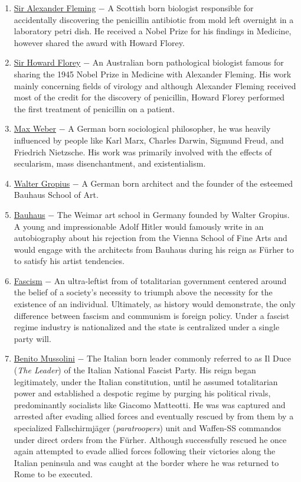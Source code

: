 \documentclass[12pt]{article}
\begin{document}
\begin{flushleft}
\begin{enumerate}
\item \underline{Sir Alexander Fleming} $-$ A Scottish born biologist responsible for accidentally discovering the penicillin antibiotic from mold left overnight in a laboratory petri dish. He received a Nobel Prize for his findings in Medicine, however shared the award with Howard Florey. 

\item \underline{Sir Howard Florey} $-$ An Australian born pathological biologist famous for sharing the 1945 Nobel Prize in Medicine with Alexander Fleming. His work mainly concerning fields of virology and although Alexander Fleming received most of the credit for the discovery of penicillin, Howard Florey performed the first treatment of penicillin on a patient.

\item \underline{Max Weber} $-$ A German born sociological philosopher, he was heavily influenced by people like Karl Marx, Charles Darwin, Sigmund Freud, and Friedrich Nietzsche. His work was primarily involved with the effects of secularism, mass disenchantment, and existentialism.

\item \underline{Walter Gropius} $-$ A German born architect and the founder of the esteemed Bauhaus School of Art.

\item \underline{Bauhaus} $-$ The Weimar art school in Germany founded by Walter Gropius. A young and impressionable Adolf Hitler would famously write in an autobiography about his rejection from the Vienna School of Fine Arts and would engage with the architects from Bauhaus during his reign as F\"urher to to satisfy his artist tendencies.

\item \underline{Fascism} $-$ An ultra-leftist from of totalitarian government centered around the belief of a society's necessity to triumph above the necessity for the existence of an individual. Ultimately, as history would demonstrate, the only difference between fascism and communism is foreign policy. Under a fascist regime industry is nationalized and the state is centralized under a single party will.

\item \underline{Benito Mussolini} $-$ The Italian born leader commonly referred to as Il Duce (\emph{The Leader}) of the Italian National Fascist Party. His reign began legitimately, under the Italian constitution, until he assumed totalitarian power and established a despotic regime by purging his political rivals, predominantly socialists like Giacomo Matteotti. He was was captured and arrested after evading allied forces and eventually rescued by from them by a specialized Fallschirmj\"ager (\emph{paratroopers}) unit and Waffen-SS commandos under direct orders from the F\"urher. Although successfully rescued he once again attempted to evade allied forces following their victories along the Italian peninsula and was caught at the border where he was returned to Rome to be executed.


\end{enumerate}
\end{flushleft}
\end{document}
